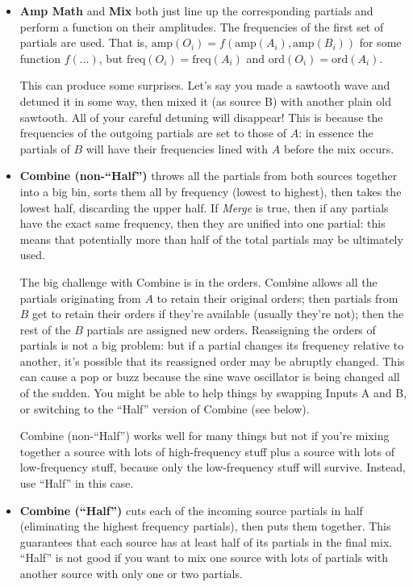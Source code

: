 \documentclass{article}
\begin{document}
\begin{itemize}
\item {\bf Amp Math} and {\bf Mix} both just line up the corresponding partials and perform a function on their amplitudes.  The frequencies of the first set of partials are used. That is, \(\text{amp}(O_i) = f(\text{amp}(A_i), \text{amp}(B_i))\) for some function \(f(...)\), but \(\text{freq}(O_i) = \text{freq}(A_i)\) and  \(\text{ord}(O_i) = \text{ord}(A_i)\).  

This can produce some surprises.  Let's say you made a sawtooth wave and detuned it in some way, then mixed it (as source B) with another plain old sawtooth.  All of your careful detuning will disappear!  This is because the frequencies of the outgoing partials are set to those of \(A\): in essence the partials of \(B\) will have their frequencies lined with \(A\) before the mix occurs.

\item {\bf Combine (non-``Half'')} throws all the partials from both sources together into a big bin, sorts them all by frequency (lowest to highest), then takes the lowest half, discarding the upper half.  If {\it Merge} is true, then if any partials have the exact same frequency, then they are unified into one partial: this means that potentially more than half of the total partials may be ultimately used.  

The big challenge with Combine is in the orders.  Combine allows all the partials originating from \(A\) to retain their original orders; then partials from \(B\) get to retain their orders if they're available (usually they're not); then the rest of the \(B\) partials are assigned new orders.  Reassigning the orders of partials is not a big problem: but if a partial changes its frequency relative to another, it's possible that its reassigned order may be abruptly changed.  This can cause a pop or buzz because the sine wave oscillator is being changed all of the sudden.  You might be able to help things by swapping Inputs A and B, or switching to the ``Half'' version of Combine (see below).

Combine (non-``Half'') works well for many things but not if you're mixing together a source with lots of high-frequency stuff plus a source with lots of low-frequency stuff, because only the low-frequency stuff will survive.  Instead, use ``Half'' in this case. 

\item {\bf Combine (``Half'')} cuts each of the incoming source partials in half (eliminating the highest frequency partials), then puts them together. This guarantees that each source has at least half of its partials in the final mix.  ``Half'' is not good if you want to mix one source with lots of partials with another source with only one or two partials.


\end{itemize}
\end{document}
